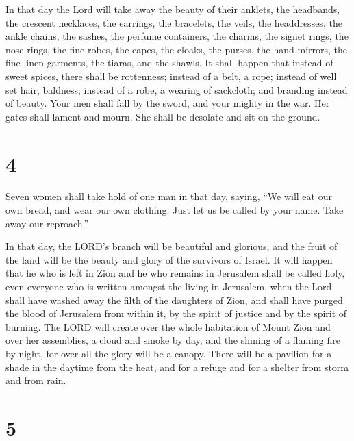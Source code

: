  In that day the Lord will take away the beauty of their
anklets, the headbands, the crescent necklaces,  the
earrings, the bracelets, the veils,  the headdresses, the
ankle chains, the sashes, the perfume containers, the charms,
 the signet rings, the nose rings,  the fine
robes, the capes, the cloaks, the purses,  the hand
mirrors, the fine linen garments, the tiaras, and the shawls.
 It shall happen that instead of sweet spices, there shall
be rottenness; instead of a belt, a rope; instead of well set hair,
baldness; instead of a robe, a wearing of sackcloth; and branding
instead of beauty.  Your men shall fall by the sword, and
your mighty in the war.  Her gates shall lament and mourn.
She shall be desolate and sit on the ground.

\hypertarget{section-3}{%
\section{4}\label{section-3}}

 Seven women shall take hold of one man in that day, saying,
``We will eat our own bread, and wear our own clothing. Just let us be
called by your name. Take away our reproach.''

 In that day, the LORD's branch will be beautiful and
glorious, and the fruit of the land will be the beauty and glory of the
survivors of Israel.  It will happen that he who is left in
Zion and he who remains in Jerusalem shall be called holy, even everyone
who is written amongst the living in Jerusalem,  when the
Lord shall have washed away the filth of the daughters of Zion, and
shall have purged the blood of Jerusalem from within it, by the spirit
of justice and by the spirit of burning.  The LORD will
create over the whole habitation of Mount Zion and over her assemblies,
a cloud and smoke by day, and the shining of a flaming fire by night,
for over all the glory will be a canopy.  There will be a
pavilion for a shade in the daytime from the heat, and for a refuge and
for a shelter from storm and from rain.

\hypertarget{section-4}{%
\section{5}\label{section-4}}

